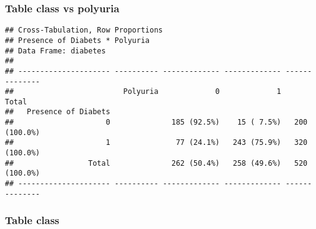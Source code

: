 \documentclass[
]{article}
\newenvironment{Shaded}{\begin{snugshade}}{\end{snugshade}}
\newcommand{\AttributeTok}[1]{\textcolor[rgb]{0.77,0.63,0.00}{#1}}
\newcommand{\FunctionTok}[1]{\textcolor[rgb]{0.00,0.00,0.00}{#1}}
\newcommand{\NormalTok}[1]{#1}
\newcommand{\SpecialCharTok}[1]{\textcolor[rgb]{0.00,0.00,0.00}{#1}}
\newcommand{\StringTok}[1]{\textcolor[rgb]{0.31,0.60,0.02}{#1}}
\begin{document}
\hypertarget{table-class-vs-polyuria}{%
\subsubsection{Table class vs polyuria}\label{table-class-vs-polyuria}}

\begin{Shaded}
\end{Shaded}

\begin{verbatim}
## Cross-Tabulation, Row Proportions  
## Presence of Diabets * Polyuria  
## Data Frame: diabetes  
## 
## --------------------- ---------- ------------- ------------- --------------
##                         Polyuria             0             1          Total
##   Presence of Diabets                                                      
##                     0              185 (92.5%)    15 ( 7.5%)   200 (100.0%)
##                     1               77 (24.1%)   243 (75.9%)   320 (100.0%)
##                 Total              262 (50.4%)   258 (49.6%)   520 (100.0%)
## --------------------- ---------- ------------- ------------- --------------
\end{verbatim}

\hypertarget{table-class}{%
\subsubsection{Table class}\label{table-class}}

\begin{Shaded}
\end{Shaded}
\end{document}
